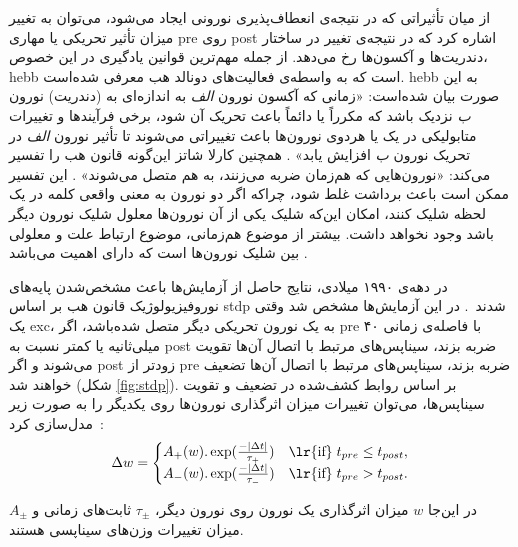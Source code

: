 \documentclass[12pt]{report}
\begin{document}
از میان تأثیراتی که در نتیجه‌ی انعطاف‌پذیری نورونی ایجاد می‌شود، می‌توان به تغییر میزان تأثیر تحریکی یا مهاری \gls{pre} روی \gls{post} اشاره کرد که در نتیجه‌ی تغییر در ساختار دندریت‌ها و آکسون‌ها رخ می‌دهد.
از جمله مهم‌ترین ‌قوانین یادگیری در این خصوص، \gls{hebb}‌ است که به واسطه‌ی فعالیت‌های دونالد هب معرفی شده‌است.
\gls{hebb} به این صورت بیان شده‌است: «زمانی که آکسون نورون \emph{الف} به اندازه‌ای به (دندریت) نورون \emph{ب} نزدیک  باشد که مکرراً یا دائماً باعث تحریک آن شود، برخی فر‌آیند‌ها و تغییرات متابولیکی در یک یا هر‌دوی نورو‌ن‌ها باعث تغییراتی می‌شوند تا تأثیر نورون \emph{الف} در تحریک نورون \emph{ب} افزایش یابد»
\cite{hebb1949organization}.
همچنین کارلا شاتز این‌گونه قانون هب را تفسیر می‌کند: «نورون‌هایی که هم‌زمان ضربه می‌زنند، به ‌هم متصل می‌شوند»
\cite{shatz1992developing}.
این تفسیر ممکن است باعث برداشت غلط شود، چراکه اگر دو نورون به معنی واقعی کلمه در یک لحظه شلیک کنند، امکان این‌که شلیک یکی از آن نورون‌ها معلول شلیک نورون دیگر باشد وجود نخواهد داشت. بیشتر از موضوع هم‌زمانی، موضوع ارتباط علت و معلولی بین شلیک نورون‌ها است که دارای اهمیت می‌باشد
\cite{granger1969investigating}.


در دهه‌ی ۱۹۹۰ میلادی، نتایج حاصل از آزمایش‌ها باعث مشخص‌شدن پایه‌های نوروفیزیولوژیک قانون هب بر اساس \gls{stdp} شدند~\cite{caporale2008spike}.
در این آزمایش‌ها مشخص شد وقتی یک \gls{exc}، به یک نورون تحریکی دیگر متصل شده‌باشد، اگر \gls{pre} با فاصله‌ی زمانی ۴۰ میلی‌ثانیه یا کمتر نسبت به \gls{post} ضربه بزند، سیناپس‌های مرتبط با اتصال آن‌ها تقویت می‌شوند و اگر \gls{post} زودتر از \gls{pre} ضربه بزند، سیناپس‌های مرتبط با اتصال آن‌ها تضعیف خواهند شد (شکل \ref{fig:stdp}).
بر اساس روابط کشف‌شده در تضعیف و تقویت سیناپس‌ها، می‌توان تغییرات میزان اثرگذاری نورون‌ها روی یکدیگر را به صورت زیر مدل‌سازی کرد~\cite{gerstner2014neuronal}:
\begin{align}
	\Delta w =
	\begin{cases}
		A_+(w).\exp(\frac{-|\Delta t|}{\tau_+})  & \text{\lr{if}}\; t_{pre} \leq t_{post}, \\
		A_-(w).\exp(\frac{-|\Delta t|}{\tau_-})  & \text{\lr{if}}\; t_{pre} > t_{post}.
	\end{cases}
	\label{eq:stdp}
\end{align}

در این‌جا $w$ میزان اثرگذاری یک نورون روی نورون دیگر، $\tau_\pm$ ثابت‌های زمانی  و $A_\pm$ میزان تغییرات وزن‌های سیناپسی هستند.
\end{document}
